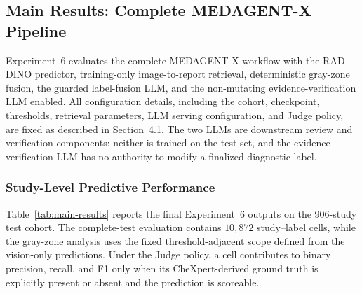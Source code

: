 \subsection{Main Results: Complete MEDAGENT-X Pipeline}
\label{sec:main-results}

Experiment~6 evaluates the complete MEDAGENT-X workflow with the RAD-DINO predictor, training-only image-to-report retrieval, deterministic gray-zone fusion, the guarded label-fusion LLM, and the non-mutating evidence-verification LLM enabled. All configuration details, including the cohort, checkpoint, thresholds, retrieval parameters, LLM serving configuration, and Judge policy, are fixed as described in Section~4.1. The two LLMs are downstream review and verification components: neither is trained on the test set, and the evidence-verification LLM has no authority to modify a finalized diagnostic label.

\subsubsection{Study-Level Predictive Performance}

Table~\ref{tab:main-results} reports the final Experiment~6 outputs on the 906-study test cohort. The complete-test evaluation contains $10{,}872$ study--label cells, while the gray-zone analysis uses the fixed threshold-adjacent scope defined from the vision-only predictions. Under the Judge policy, a cell contributes to binary precision, recall, and F1 only when its CheXpert-derived ground truth is explicitly present or absent and the prediction is scoreable.

\begin{table}[H]
\centering
\caption{Main predictive results for Experiment~6, the complete MEDAGENT-X pipeline. Metrics are computed under the fixed Judge policy on the full test scope and the frozen gray-zone scope.}
\label{tab:main-results}
\end{table}

